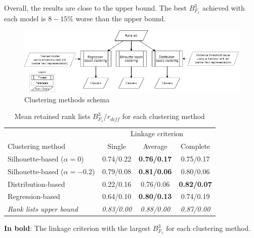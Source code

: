 Overall, the results are close to the upper bound.
The best $B^{3}_{F_1}$ achieved with each model is $8-15\%$ worse than the upper bound.

\begin{figure}[!t]
  \centering
  \caption{Clustering methods schema}
  \label{fig:schema-clustering}
  \includegraphics[width=1\linewidth]{img/schema-clustering.png}
\end{figure}

\begin{table}[!t]
  \centering
  \caption{Mean retained rank lists $B^{3}_{F_1}$/$r_{diff}$ for each clustering method}
  \label{tab:clustering_evaluation_summary}
  \begin{tabular}{l c c c}
    \toprule
                                       & \multicolumn{3}{c}{Linkage criterion} \\
    Clustering method                  & Single         & Average            & Complete \\
    \midrule
    Silhouette-based ($\alpha = 0$)    & 0.74/0.22      & \textbf{0.76/0.17} & 0.75/0.17 \\
    Silhouette-based ($\alpha = -0.2$) & 0.79/0.08      & \textbf{0.81/0.06} & 0.80/0.06 \\
    Distribution-based                 & 0.22/0.16      & 0.76/0.06          & \textbf{0.82/0.07} \\
    Regression-based                   & 0.64/0.10      & \textbf{0.80/0.13} & 0.74/0.19 \\
    \midrule
    \textit{Rank lists upper bound}    & \textit{0.83/0.00} & \textit{0.88/0.00} & \textit{0.87/0.00} \\
    \bottomrule
  \end{tabular}

  \vspace{0.2cm}
  \textbf{In bold}: The linkage criterion with the largest $B^{3}_{F_1}$ for each clustering method.
\end{table}
